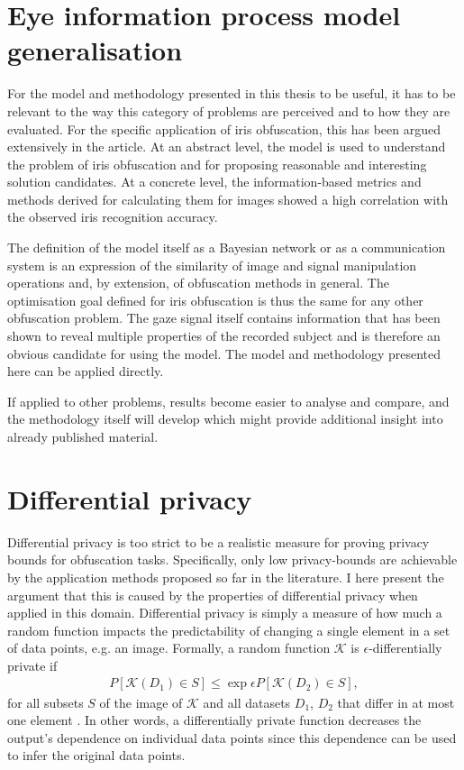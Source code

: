 
\section{Eye information process model generalisation}
For the model and methodology presented in this thesis to be useful, it has to be relevant to the way this category of problems are perceived and to how they are evaluated. For the specific application of iris obfuscation, this has been argued extensively in the article. At an abstract level, the model is used to understand the problem of iris obfuscation and for proposing reasonable and interesting solution candidates. At a concrete level, the information-based metrics and methods derived for calculating them for images showed a high correlation with the observed iris recognition accuracy.

The definition of the model itself as a Bayesian network or as a communication system is an expression of the similarity of image and signal manipulation operations and, by extension, of obfuscation methods in general. The optimisation goal defined for iris obfuscation is thus the same for any other obfuscation problem. The gaze signal itself contains information that has been shown to reveal multiple properties of the recorded subject and is therefore an obvious candidate for using the model. The model and methodology presented here can be applied directly. 

If applied to other problems, results become easier to analyse and compare, and the methodology itself will develop which might provide additional insight into already published material. 

\section{Differential privacy}
Differential privacy is too strict to be a realistic measure for proving privacy bounds for obfuscation tasks. Specifically, only low privacy-bounds are achievable by the application methods proposed so far in the literature. I here present the argument that this is caused by the properties of differential privacy when applied in this domain. Differential privacy is simply a measure of how much a random function impacts the predictability of changing a single element in a set of data points, e.g. an image. Formally, a random function $\mathcal{K}$ is $\epsilon$-differentially private if
\begin{align}
	P[\mathcal{K}(D_1)\in S] \leq \exp{\epsilon} P[\mathcal{K}(D_2)\in S],
\end{align}
for all subsets $S$ of the image of $\mathcal{K}$ and all datasets $D_1$, $D_2$ that differ in at most one element \parencite{dwork2006differential}. In other words, a differentially private function decreases the output's dependence on individual data points since this dependence can be used to infer the original data points.


